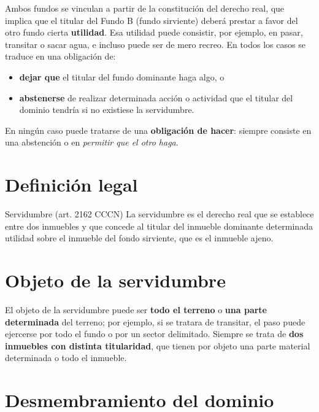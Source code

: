 \documentclass[12pt,oneside]{book}
\begin{document}
Ambos fundos se vinculan a partir de la constitución del derecho real, que implica que el titular del Fundo B (fundo sirviente) deberá prestar a favor del otro fundo cierta \textbf{utilidad}. Esa utilidad puede consistir, por ejemplo, en pasar, transitar o sacar agua, e incluso puede ser de mero recreo. En todos los casos se traduce en una obligación de:

\begin{itemize}
    \item \textbf{dejar que} el titular del fundo dominante haga algo, o
    \item \textbf{abstenerse} de realizar determinada acción o actividad que el titular del dominio tendría si no existiese la servidumbre.
\end{itemize}

\begin{important}
En ningún caso puede tratarse de una \textbf{obligación de hacer}: siempre consiste en una abstención o en \emph{permitir que el otro haga}.
\end{important}

\section{Definición legal}

\begin{definition}{Servidumbre (art. 2162 CCCN)}
La servidumbre es el derecho real que se establece entre dos inmuebles y que concede al titular del inmueble dominante determinada utilidad sobre el inmueble del fondo sirviente, que es el inmueble ajeno.
\end{definition}

\section{Objeto de la servidumbre}

El objeto de la servidumbre puede ser \textbf{todo el terreno} o \textbf{una parte determinada} del terreno; por ejemplo, si se tratara de transitar, el paso puede ejercerse por todo el fundo o por un sector delimitado. Siempre se trata de \textbf{dos inmuebles con distinta titularidad}, que tienen por objeto una parte material determinada o todo el inmueble.

\section{Desmembramiento del dominio}
\end{document}

